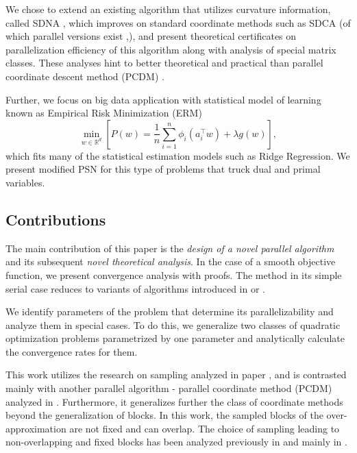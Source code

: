 \documentclass[11pt]{article}
\begin{document}
	We chose to extend an existing algorithm that utilizes curvature information, called SDNA \cite{SDNA}, which improves on standard coordinate methods such as SDCA \cite{Shalev-Shwartz2013} (of which parallel versions exist \cite{PCDM},\cite{Richtarik2012}), and present theoretical certificates on parallelization efficiency of this algorithm along with analysis of special matrix classes. These analyses hint to better theoretical and practical than parallel coordinate descent method (PCDM) \cite{PCDM}. 
	
	Further, we focus on big data application with statistical model of learning known as Empirical Risk Minimization (ERM)
	\begin{equation}
		\min_{w \in \mathbb{R}^d} \left[P(w)  = \frac{1}{n}\sum_{i=1}^{n} \phi_i(a_i^\top w )+ \lambda g(w) \right],
	\end{equation}
	which fits many of the statistical estimation models such as Ridge Regression. We present modified PSN for this type of problems that truck dual and primal variables. 
	
	\subsection{Contributions}
	The main contribution of this paper is the {\em design of a novel parallel algorithm} and its subsequent {\em novel theoretical analysis}. In the case of a smooth objective function, we present convergence analysis with proofs. The method in its simple serial case reduces to variants of algorithms introduced in \cite{SDNA} or \cite{Shalev-Shwartz2013}. 
	
	We identify parameters of the problem that determine its parallelizability and analyze them in special cases. To do this, we generalize two classes of quadratic optimization problems parametrized by one parameter and analytically calculate the convergence rates for them. 
	
	This work utilizes the research on sampling analyzed in paper \cite{ESO}, and is contrasted mainly with another parallel algorithm - parallel coordinate method (PCDM) analyzed in \cite{NSYNC}. Furthermore, it generalizes further the class of coordinate methods beyond the generalization of blocks. In this work, the sampled blocks of the over-approximation are not fixed and can overlap. The choice of sampling leading to non-overlapping and fixed blocks has been analyzed previously in \cite{Fountoulakis2015,Marecek2014} and mainly in \cite{Richtarik2012}.
	
\end{document}
